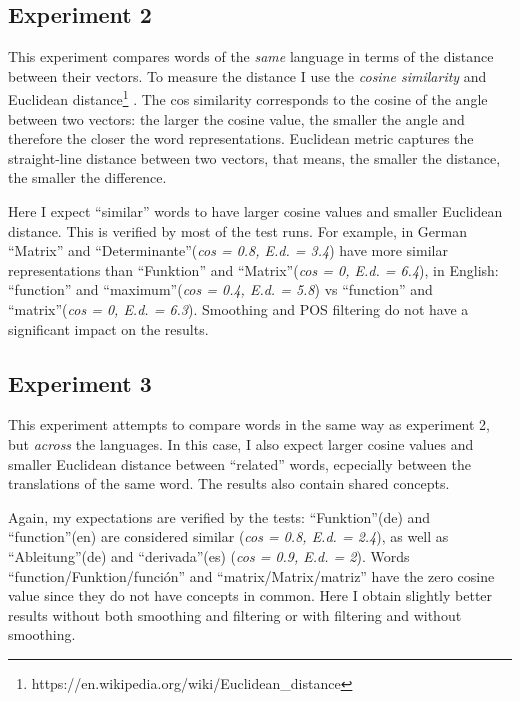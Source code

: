 \documentclass[a4paper]{article}
\begin{document}
\subsection{Experiment 2}
This experiment compares words of the \textit{same} language in terms of the distance between their vectors. To measure the distance I use the \textit{cosine similarity}\cite{j} and Euclidean distance\footnote{https://en.wikipedia.org/wiki/Euclidean_distance} . The cos similarity corresponds to the cosine of the angle between two vectors: the larger the cosine value, the smaller the angle and therefore the closer the word representations. Euclidean metric captures the straight-line distance between two vectors, that means, the smaller the distance, the smaller the difference. \par
Here I expect ``similar'' words to have larger cosine values and smaller Euclidean distance. This is verified by most of the test runs. For example, in German ``Matrix'' and ``Determinante''(\textit{cos = 0.8, E.d. = 3.4}) have more similar representations than ``Funktion'' and ``Matrix''(\textit{cos = 0, E.d. = 6.4}), in English: ``function'' and ``maximum''(\textit{cos = 0.4, E.d. = 5.8}) vs ``function'' and ``matrix''(\textit{cos = 0, E.d. = 6.3}). Smoothing and POS filtering do not have a significant impact on the results.
\subsection{Experiment 3}
This experiment attempts to compare words in the same way as experiment 2, but \textit{across} the languages. In this case, I also expect larger cosine values and smaller Euclidean distance between ``related'' words, ecpecially between the translations of the same word. The results also contain shared concepts.\par
Again, my expectations are verified by the tests: ``Funktion''(de) and ``function''(en) are considered similar (\textit{cos = 0.8, E.d. = 2.4}), as well as ``Ableitung''(de) and ``derivada''(es) (\textit{cos = 0.9, E.d. = 2}). Words ``function/Funktion/funci\'on'' and ``matrix/Matrix/matriz'' have the zero cosine value since they do not have concepts in common. Here I obtain slightly better results without both smoothing and filtering or with filtering and without smoothing.
 
\end{document}
